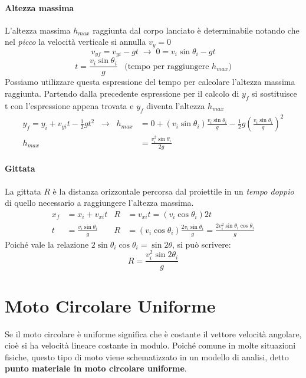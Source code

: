 \documentclass[12pt,oneside]{book}
\begin{document}
\paragraph{Altezza massima}
L'altezza massima $h_{max}$ raggiunta dal corpo lanciato è determinabile notando che nel \emph{picco} la velocità verticale si annulla $v_y = 0$
\begin{equation*}
    v_{yf} = v_{yi} - gt \; \rightarrow \; 0 = v_i \sin{\theta_i} -gt
\end{equation*}
\begin{equation*}
    t = \frac{v_i \sin{\theta_i}}{g} \;\;\; \text{(tempo per raggiungere } h_{max} \text{)}
\end{equation*}
Possiamo utilizzare questa espressione del tempo per calcolare l'altezza massima raggiunta. Partendo dalla precedente espressione per il calcolo di
$y_f$ si sostituisce t con l'espressione appena trovata e $y_f$ diventa l'altezza $h_{max}$
\begin{align*}
    y_f = y_i + v_{yi}t - \tfrac{1}{2}gt^2 \;\; \rightarrow \;\; h_{max} & = 0 + (v_i \sin{\theta_i})\tfrac{v_i \sin{\theta_i}}{g} - \tfrac{1}{2}g(\tfrac{v_i \sin{\theta_i}}{g})^2 \\
    h_{max}                                                              & = \frac{v_i^2 \sin{\theta_i}}{2g}
\end{align*}

\paragraph{Gittata}
La gittata $R$ è la distanza orizzontale percorsa dal proiettile in un \emph{tempo doppio} di quello necessario a raggiungere l'altezza massima.
\begin{align*}
    x_f & = x_i + v_{xi}t                 & R & = v_{xi}t = (v_i \cos{\theta_i})2t                                                                     \\
    t   & = \tfrac{v_i \sin{\theta_i}}{g} & R & = (v_i \cos{\theta_i}) \tfrac{2v_i \sin{\theta_i}}{g} = \tfrac{2v_i^2 \sin{\theta_i}\cos{\theta_i}}{g}
\end{align*}
Poiché vale la relazione $2\sin{\theta_i}\cos{\theta_i} = \sin{2\theta}$, si può scrivere:
\begin{equation*}
    R = \frac{v_i^2 \sin{2\theta_i}}{g}
\end{equation*}


\section{Moto Circolare Uniforme}
Se il moto circolare è uniforme significa che è costante il vettore velocità angolare, cioè si ha velocità lineare costante in modulo. 
Poiché comune in molte situazioni fisiche, questo tipo di moto viene schematizzato in un modello di analisi, detto \textbf{punto materiale in moto circolare uniforme}.
\end{document}
